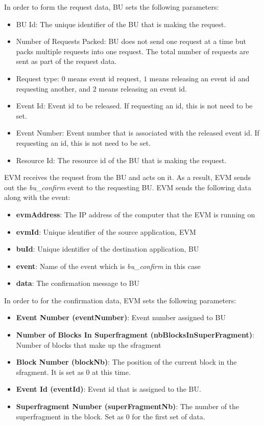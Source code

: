 In order to form the request data, BU sets the following parameters:
\begin{itemize}
	\item BU Id: The unique identifier of the BU that is making the request.
	\item Number of Requests Packed: BU does not send one request at a time but packs multiple requests into one request. The total number of requests are sent as part of the request data.
	\item Request type: $0$ means event id request, $1$ means releasing an event id and requesting another, and $2$ means releasing an event id.
	\item Event Id: Event id to be released. If requesting an id, this is not need to be set.
	\item Event Number: Event number that is associated with the released event id. If requesting an id, this is not need to be set.
	\item Resource Id: The resource id of the BU that is making the request.
\end{itemize}

EVM receives the request from the BU and acts on it. As a result, EVM sends out the \textit{bu\_confirm} event to the requesting BU. EVM sends the following data along with the event:

\begin{itemize}
	\item \textbf{evmAddress}: The IP address of the computer that the EVM is running on
	\item \textbf{evmId}: Unique identifier of the source application, EVM
	\item \textbf{buId}: Unique identifier of the destination application, BU
	\item \textbf{event}: Name of the event which is \textit{bu\_confirm} in this case
	\item \textbf{data}: The confirmation message to BU
\end{itemize}

In order to for the confirmation data, EVM sets the following parameters:

\begin{itemize}
	\item \textbf{Event Number (eventNumber)}: Event number assigned to BU
	\item \textbf{Number of Blocks In Superfragment (nbBlocksInSuperFragment)}: Number of blocks that make up the sfragment
	\item \textbf{Block Number (blockNb)}: The position of the current block in the sfragment. It is set as $0$ at this time.
	\item \textbf{Event Id (eventId)}: Event id that is assigned to the BU.
	\item \textbf{Superfragment Number (superFragmentNb)}: The number of the superfragment in the block. Set as $0$ for the first set of data.
\end{itemize}



